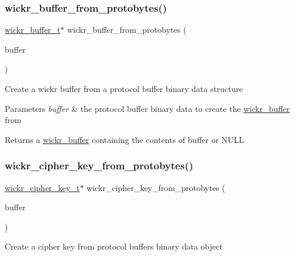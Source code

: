 \subsubsection{\texorpdfstring{wickr\+\_\+buffer\+\_\+from\+\_\+protobytes()}{wickr\_buffer\_from\_protobytes()}}
{\footnotesize\ttfamily \hyperlink{structwickr__buffer}{wickr\+\_\+buffer\+\_\+t}$\ast$ wickr\+\_\+buffer\+\_\+from\+\_\+protobytes (\begin{DoxyParamCaption}\item[{Protobuf\+C\+Binary\+Data}]{buffer }\end{DoxyParamCaption})}

Create a wickr buffer from a protocol buffer binary data structure


\begin{DoxyParams}{Parameters}
{\em buffer} & the protocol buffer binary data to create the \hyperlink{structwickr__buffer}{wickr\+\_\+buffer} from \\
\hline
\end{DoxyParams}
\begin{DoxyReturn}{Returns}
a \hyperlink{structwickr__buffer}{wickr\+\_\+buffer} containing the contents of \textquotesingle{}buffer\textquotesingle{} or N\+U\+LL 
\end{DoxyReturn}
\mbox{\label{group__protobuf__utils_ga29c41b9d38441ba0fc54c7ffc0ea91a4}} 
\subsubsection{\texorpdfstring{wickr\+\_\+cipher\+\_\+key\+\_\+from\+\_\+protobytes()}{wickr\_cipher\_key\_from\_protobytes()}}
{\footnotesize\ttfamily \hyperlink{structwickr__cipher__key}{wickr\+\_\+cipher\+\_\+key\+\_\+t}$\ast$ wickr\+\_\+cipher\+\_\+key\+\_\+from\+\_\+protobytes (\begin{DoxyParamCaption}\item[{Protobuf\+C\+Binary\+Data}]{buffer }\end{DoxyParamCaption})}

Create a cipher key from protocol buffers binary data object


